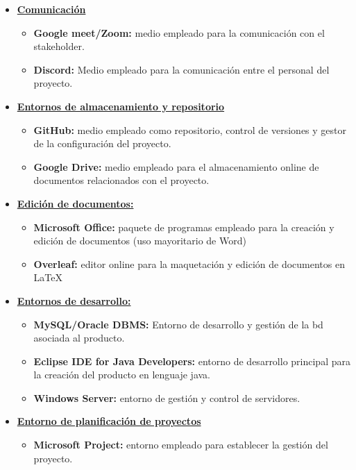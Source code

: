 \begin{itemize}
	\item \textbf{\underline{Comunicación}}
	      \begin{itemize}
		      \item \textbf{Google meet/Zoom:} medio empleado para la comunicación con el stakeholder.
		      \item\textbf{Discord:} Medio empleado para la comunicación entre el personal del proyecto.
	      \end{itemize}
	\item \textbf{\underline{Entornos de almacenamiento y repositorio}}
	      \begin{itemize}
		      \item\textbf{GitHub:} medio empleado como repositorio, control de versiones y gestor de la configuración del proyecto.
		      \item\textbf{Google Drive:} medio empleado para el almacenamiento online de documentos relacionados con el proyecto.
	      \end{itemize}
	\item \textbf{\underline{Edición de documentos:}}
	      \begin{itemize}
		      \item\textbf{Microsoft Office:} paquete de programas empleado para la creación y edición de documentos  (uso mayoritario de Word)
		      \item\textbf{Overleaf:} editor online para la maquetación y edición de documentos en \LaTeX
	      \end{itemize}
	\item \textbf{\underline{Entornos de desarrollo:}}
	      \begin{itemize}
		      \item\textbf{MySQL/Oracle DBMS:} Entorno de desarrollo y gestión de la \gls{bd} asociada al producto.
		      \item\textbf{Eclipse IDE for Java Developers:} entorno de desarrollo principal para la creación del producto en lenguaje java.
		      \item\textbf{Windows Server:} entorno de gestión y control de servidores.
	      \end{itemize}
	\item \textbf{\underline{Entorno de planificación de proyectos}}
	      \begin{itemize}
		      \item\textbf{Microsoft Project:} entorno empleado para establecer la gestión del proyecto.

\end{itemize}
\end{itemize}
